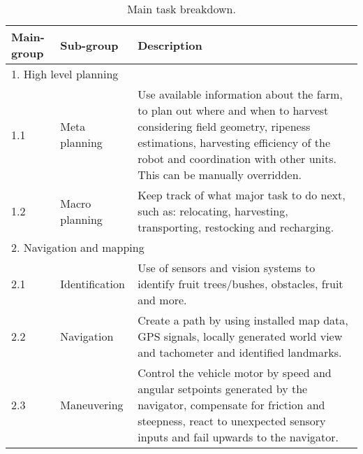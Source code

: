 \documentclass[%
oneside,    %
project,    %
nosummary   %
]{USN-MSc}
\begin{document}
\begin{longtable}{| m{1.5cm} | m{3cm} | m{10cm} |}
  \caption{Main task breakdown.} \label{tab:breakdown}                                                                                                                                                                                        \\
  \hline
  Main-group
   & Sub-group
   & Description                                                                                                                                                                                                                              \\ \hline
  \multicolumn{3}{|l|}{1. High level planning}                                                                                                                                                                                                \\ \hline
  1.1
   & Meta planning
   & Use available information about the farm, to plan out where and when to harvest considering field geometry, ripeness estimations, harvesting efficiency of the robot and coordination with other units. This can be manually overridden. \\ \hline
  1.2
   & Macro planning
   & Keep track of what major task to do next, such as: relocating, harvesting, transporting, restocking and recharging.                                                                                                                      \\ \hline
  \multicolumn{3}{|l|}{2. Navigation and mapping}                                                                                                                                                                                             \\ \hline
  2.1
   & Identification
   & Use of sensors and vision systems to identify fruit trees/bushes, obstacles, fruit and more.                                                                                                                                             \\ \hline
  2.2
   & Navigation
   & Create a path by using installed map data, GPS signals, locally generated world view and tachometer and identified landmarks.                                                                                                            \\ \hline
  2.3
   & Maneuvering
   & Control the vehicle motor by speed and angular setpoints generated by the navigator, compensate for friction and steepness, react to unexpected sensory inputs and fail upwards to the navigator.                                        \\ \hline

\end{longtable}
\end{document}

